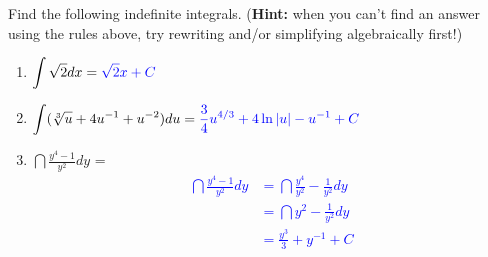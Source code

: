 \documentclass[10pt]{article}
\begin{document}
{}  Find the following indefinite integrals. ({\bf Hint:} when you can't find an answer using the rules above, try rewriting and/or simplifying algebraically first!) 

\begin{enumerate}
\item[(a)] $\displaystyle\int \sqrt2 dx = \textcolor{blue}{\sqrt2 x + C}$
\item[(b)] $\displaystyle\int (\sqrt[3]{u}+4u^{-1}+u^{-2}) du = \textcolor{blue}{\frac{3}{4} u^{4/3} + 4 \ln|u| - u^{-1} + C}$
\item[(c)] $\dint \frac{y^4-1}{y^2} dy$ = \textcolor{blue}{
\begin{align*}
\dint \frac{y^4-1}{y^2} dy 
&= \dint \frac{y^4}{y^2} -\frac{1}{y^2} dy\\
&= \dint y^2 -\frac{1}{y^2} dy\\
&= \frac{y^3}{3} + y^{-1} + C
\end{align*}
}
\end{enumerate}

\newpage
\end{document}

